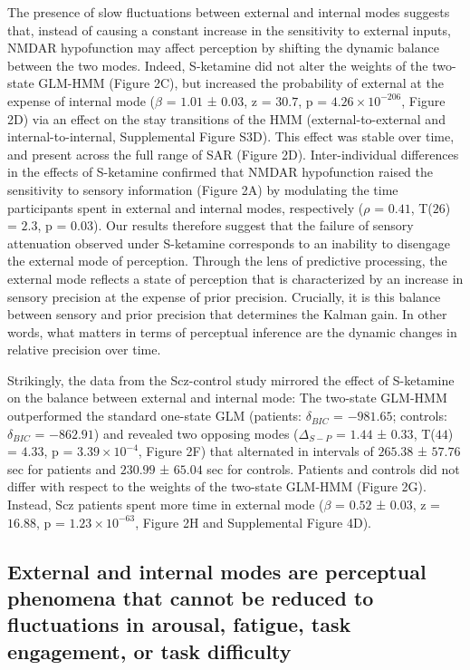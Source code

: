 \documentclass[
]{article}
\begin{document}
The presence of slow fluctuations between external and internal modes
suggests that, instead of causing a constant increase in the sensitivity
to external inputs, NMDAR hypofunction may affect perception by shifting
the dynamic balance between the two modes. Indeed, S-ketamine did not
alter the weights of the two-state GLM-HMM (Figure 2C), but increased
the probability of external at the expense of internal mode (\(\beta\) =
\(1.01\) ± \(0.03\), z = \(30.7\), p =
\(\ensuremath{4.26\times 10^{-206}}\), Figure 2D) via an effect on the
stay transitions of the HMM (external-to-external and
internal-to-internal, Supplemental Figure S3D). This effect was stable
over time, and present across the full range of SAR (Figure 2D).
Inter-individual differences in the effects of S-ketamine confirmed that
NMDAR hypofunction raised the sensitivity to sensory information (Figure
2A) by modulating the time participants spent in external and internal
modes, respectively (\(\rho\) = \(0.41\), T(\(26\)) = \(2.3\), p =
\(0.03\)). Our results therefore suggest that the failure of sensory
attenuation observed under S-ketamine corresponds to an inability to
disengage the external mode of perception. Through the lens of
predictive processing, the external mode reflects a state of perception
that is characterized by an increase in sensory precision at the expense
of prior precision. Crucially, it is this balance between sensory and
prior precision that determines the Kalman gain. In other words, what
matters in terms of perceptual inference are the dynamic changes in
relative precision over time.

Strikingly, the data from the Scz-control study mirrored the effect of
S-ketamine on the balance between external and internal mode: The
two-state GLM-HMM outperformed the standard one-state GLM (patients:
\(\delta_{BIC}\) = \(-981.65\); controls: \(\delta_{BIC}\) =
\(-862.91\)) and revealed two opposing modes (\(\Delta_{S-P}\) =
\(1.44\) ± \(0.33\), T(\(44\)) = \(4.33\), p =
\(\ensuremath{3.39\times 10^{-4}}\), Figure 2F) that alternated in
intervals of \(265.38\) ± \(57.76\) sec for patients and \(230.99\) ±
\(65.04\) sec for controls. Patients and controls did not differ with
respect to the weights of the two-state GLM-HMM (Figure 2G). Instead,
Scz patients spent more time in external mode (\(\beta\) = \(0.52\) ±
\(0.03\), z = \(16.88\), p = \(\ensuremath{1.23\times 10^{-63}}\),
Figure 2H and Supplemental Figure 4D).

\subsection{External and internal modes are perceptual phenomena that
cannot be reduced to fluctuations in arousal, fatigue, task engagement,
or task
difficulty}\label{external-and-internal-modes-are-perceptual-phenomena-that-cannot-be-reduced-to-fluctuations-in-arousal-fatigue-task-engagement-or-task-difficulty}
\end{document}
